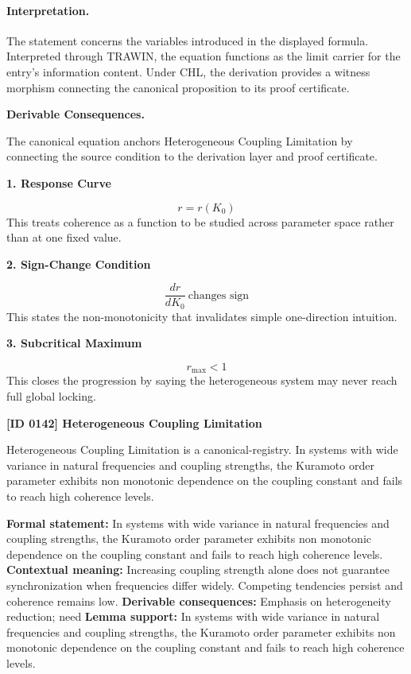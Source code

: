 \paragraph{Interpretation.}
The statement concerns the variables introduced in the displayed formula. Interpreted through TRAWIN, the equation functions as the limit carrier for the entry’s information content. Under CHL, the derivation provides a witness morphism connecting the canonical proposition to its proof certificate.

\par\vspace{0.35em}
\noindent\textbf{Derivable Consequences.}\quad
\begingroup
\footnotesize
\raggedright
The canonical equation anchors Heterogeneous Coupling Limitation by connecting the source condition to the derivation layer and proof certificate.
\par\endgroup

\noindent\textbf{1. Response Curve}\par
\[
r=r(K_0)
\]
\noindent This treats coherence as a function to be studied across parameter space rather than at one fixed value.\par
\noindent\textbf{2. Sign-Change Condition}\par
\[
\frac{dr}{dK_0}\ \text{changes sign}
\]
\noindent This states the non-monotonicity that invalidates simple one-direction intuition.\par
\noindent\textbf{3. Subcritical Maximum}\par
\[
r_{\max}<1
\]
\noindent This closes the progression by saying the heterogeneous system may never reach full global locking.\par

\clearpage
\noindent\textbf{[ID 0142] Heterogeneous Coupling Limitation}\par
\vspace{0.35em}
\begingroup\small
{}
Heterogeneous Coupling Limitation is a canonical-registry. In systems with wide variance in natural frequencies and coupling strengths, the Kuramoto order parameter exhibits non monotonic dependence on the coupling constant and fails to reach high coherence levels.

\begingroup\footnotesize\setlength{\emergencystretch}{3em}\sloppy
\textbf{Formal statement:} In systems with wide variance in natural frequencies and coupling strengths, the Kuramoto order parameter exhibits non monotonic dependence on the coupling constant and fails to reach high coherence levels.
\textbf{Contextual meaning:} Increasing coupling strength alone does not guarantee synchronization when frequencies differ widely. Competing tendencies persist and coherence remains low.
\textbf{Derivable consequences:} Emphasis on heterogeneity reduction; need
\textbf{Lemma support:} In systems with wide variance in natural frequencies and coupling strengths, the Kuramoto order parameter exhibits non monotonic dependence on the coupling constant and fails to reach high coherence levels.\par
\endgroup

